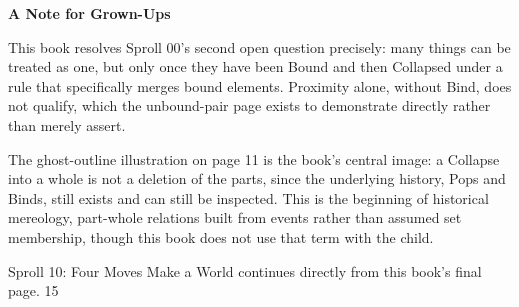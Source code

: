 \documentclass[12pt]{book}
\newcommand{\pagenum}[1]{\vfill{\color{gray!50}\footnotesize #1}}
\newcommand{\sprollpage}{\newpage\vspace*{0.4in}}
\begin{document}
\sprollpage
\vspace*{0.3in}
{\large \textbf{A Note for Grown-Ups}}
\vspace{0.2in}

\normalsize
This book resolves Sproll 00's second open question precisely: many things can be treated as one, but only once they have been Bound and then Collapsed under a rule that specifically merges bound elements. Proximity alone, without Bind, does not qualify, which the unbound-pair page exists to demonstrate directly rather than merely assert.

\vspace{0.15in}
The ghost-outline illustration on page 11 is the book's central image: a Collapse into a whole is not a deletion of the parts, since the underlying history, Pops and Binds, still exists and can still be inspected. This is the beginning of historical mereology, part-whole relations built from events rather than assumed set membership, though this book does not use that term with the child.

\vspace{0.3in}
{\small Sproll 10: Four Moves Make a World continues directly from this book's final page.}
\pagenum{15}
\end{document}
